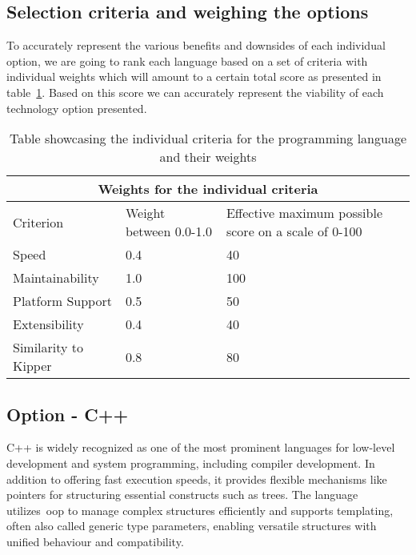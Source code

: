 \subsection{Selection criteria and weighing the options}
\label{sec:development-language-selection-criteria}

To accurately represent the various benefits and downsides of each individual option, we are going to rank each language based on a set of criteria with individual weights which will amount to a certain total score as presented in table~\ref{tab:programming-language-criteria-weights}. Based on this score we can accurately represent the viability of each technology option presented.

\begin{table}[H]
	\centering
	\begin{tabular}{ |p{4cm}|p{5cm}|p{5cm}|  }
		\hline
		\multicolumn{3}{|c|}{Weights for the individual criteria} \\
		\hline
		Criterion&Weight between 0.0-1.0&Effective maximum possible score on a scale of 0-100\\
		\hline
		Speed&0.4&40\\
		Maintainability&1.0&100\\
		Platform Support&0.5&50\\
		Extensibility&0.4&40\\
		Similarity to Kipper&0.8&80\\
		\hline
	\end{tabular}
	\caption{Table showcasing the individual criteria for the programming language and their weights}
	\label{tab:programming-language-criteria-weights}
\end{table}

\subsection{Option - C++}
\label{sec:programming-language-option-c++}

C++ is widely recognized as one of the most prominent languages for low-level development and system programming, including compiler development. In addition to offering fast execution speeds, it provides flexible mechanisms like pointers for structuring essential constructs such as trees. The language utilizes~\acrshort{oop} to manage complex structures efficiently and supports templating, often also called generic type parameters, enabling versatile structures with unified behaviour and compatibility.

